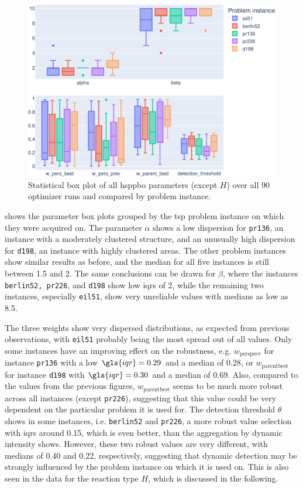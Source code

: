 \begin{figure}[h]
	\centering
	\includegraphics[width=\textwidth]{results/part2/parameter_boxplot_problem.svg}
	\caption[Statistical box plot of \gls{hsppbo} parameters compared by problem instance]{Statistical box plot of all \gls{hsppbo} parameters (except $H$) over all 90 optimizer runs and compared by problem instance.}
	\label{fig:parameter_boxplot_problem}
\end{figure}

 shows the parameter box plots grouped by the \gls{tsp} problem instance on which they were acquired on. The parameter $\alpha$ shows a low dispersion for \texttt{pr136}, an instance with a moderately clustered structure, and an unusually high dispersion for \texttt{d198}, an instance with highly clustered areas. The other problem instances show similar results as before, and the median for all five instances is still between 1.5 and 2. The same conclusions can be drawn for $\beta$, where the instances \texttt{berlin52, pr226}, and \texttt{d198} show low \glspl{iqr} of 2, while the remaining two instances, especially \texttt{eil51}, show very unreliable values with medians as low as 8.5. 

The three weights show very dispersed distributions, as expected from previous observations, with \texttt{eil51} probably being the most spread out of all values. Only some instances have an improving effect on the robustness, e.g. $w_{\text{persprev}}$ for instance \texttt{pr136} with a low $\gls{iqr} =  0.29$ and a median of 0.28, or $w_{\text{parentbest}}$ for instance \texttt{d198} with $\gls{iqr} =  0.30$ and a median of 0.69. Also, compared to the values from the previous figures, $w_{\text{parentbest}}$ seems to be much more robust across all instances (except \texttt{pr226}), suggesting that this value could be very dependent on the particular problem it is used for.
The detection threshold $\theta$ shows in some instances, i.e. \texttt{berlin52} and \texttt{pr226}, a more robust value selection with \glspl{iqr} around 0.15, which is even better, than the aggregation by dynamic intensity shows. However, these two robust values are very different, with medians of 0.40 and 0.22, respectively, suggesting that dynamic detection may be strongly influenced by the problem instance on which it is used on. This is also seen in the data for the reaction type $H$, which is discussed in the following.
 
